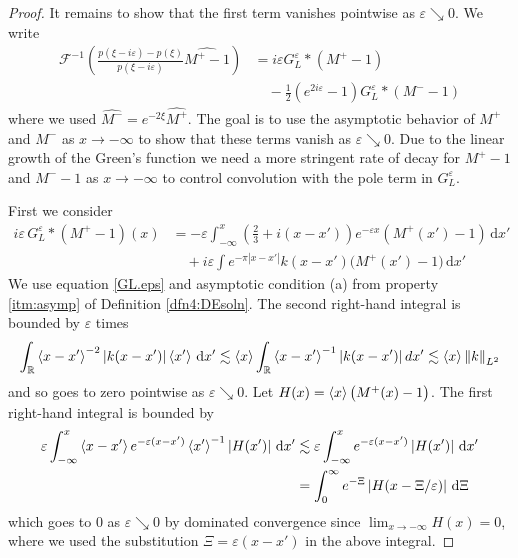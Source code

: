 \documentclass[../dissertation.tex]{subfiles}
\begin{document}
\begin{proof}
	It remains to show that the first term vanishes pointwise as 
	$\varepsilon \searrow 0$. We write
	\begin{align*}
		\mathcal F^{-1} 
				\left( 
					\frac{p(\xi-i\varepsilon) - p(\xi)}
						{p(\xi-i\varepsilon)} \widehat{M^+-1} 
				\right)
			&=	i\varepsilon G_L^\varepsilon * (M^+ -1) \\
			&\quad- 
				\frac{1}{2} \left(e^{2i\varepsilon}-1 \right) 
				G_L^\varepsilon*(M^- - 1)
	\end{align*}
	where we used $\widehat{M^-} = e^{-2\xi} \widehat{M^+}$. The goal is to use
	the asymptotic behavior of $M^+$ and $M^-$ as $x \to -\infty$ to show that 
	these terms vanish as $\varepsilon \searrow 0$. Due to the linear growth 
	of the Green's function we need a more stringent rate of decay for 
	$M^+-1$ and $M^- - 1$ as $x \to -\infty$ to control convolution with the pole 
	term in $G_L^\varepsilon$.  

	First we consider 
	\begin{align*}
		i\varepsilon \, G_L^\varepsilon*(M^+ - 1) (x) 
			&=	
				-\varepsilon 
				\int_{-\infty}^x 
					\left( \frac{2}{3} + i(x-x') \right) 
					e^{-\varepsilon x} \left(M^+(x') - 1\right) 
				\, \mathrm{d}x' \\
			&\quad 	
				+ i\varepsilon \int e^{-\pi|x-x'|} k(x-x') \big(M^+(x')-1\big) \, \mathrm{d}x'
	\end{align*}
	We use equation \eqref{GL.eps} and asymptotic condition (a) from 
	property \ref{itm:asymp} of Definition \ref{dfn4:DEsoln}.
	The second right-hand integral is bounded by $\varepsilon$ times
	\[
		\int_{\mathbb R} \left\langle x-x' \right\rangle^{-2} |k(x-x')| \left\langle x' \right\rangle \, \mathrm{d}x' 
			\lesssim
				\left\langle x \right\rangle 
				\int_{\mathbb R} 
					\left\langle x-x' \right\rangle^{-1} |k(x-x')| \,dx'
			\lesssim \left\langle x \right\rangle \left\| k \right\|_{L^2}
	\]
	and so goes to zero pointwise as $\varepsilon \searrow 0$. 
	Let $H(x) = \left\langle x \right\rangle\big(M^+(x)-1\big)$. The first right-hand integral is 
	bounded by 
	\begin{align*}
	\varepsilon 
		\int_{-\infty}^x 
			\left\langle x-x' \right\rangle e^{-\varepsilon (x-x')} \left\langle x' \right\rangle^{-1}   
			\left|H(x') \right| 
		\, \mathrm{d}x'  
		&\lesssim 
			\varepsilon 
			\int_{-\infty}^x 
				e^{-\varepsilon (x-x')} \left| H(x') \right| 
			\, \mathrm{d}x'
			\\
		&=	\int_0^{\infty} e^{-\Xi} \left| H(x-\Xi/\varepsilon) \right| \, \mathrm{d}\Xi
	\end{align*}
	which goes to $0$ as $\varepsilon \searrow 0$ by dominated convergence since
	$\lim_{x \to -\infty} H(x) = 0$, where we used the substitution 
	$\Xi = \varepsilon(x-x')$ in the above integral.


\end{proof}
\end{document}
